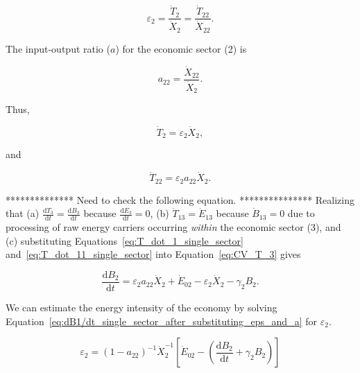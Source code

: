 \begin{equation} \label{eq:single_sector_energy_intensity}
	\varepsilon_{2} = \frac{\dot{T}_{2}}{\dot{X}_{2}} = \frac{\dot{T}_{22}}{\dot{X}_{22}}.
\end{equation}

The input-output ratio ($a$) for the economic sector (2) is

\begin{equation} \label{eq:io_ratio_single_sector}
	a_{22} = \frac{\dot{X}_{22}}{\dot{X}_{2}}.
\end{equation}

\noindent Thus,

\begin{equation} \label{eq:T_dot_1_single_sector}
	\dot{T}_{2} = \varepsilon_{2}\dot{X}_{2},
\end{equation}

\noindent and

\begin{equation} \label{eq:T_dot_11_single_sector}
	\dot{T}_{22} = \varepsilon_{2}a_{22}\dot{X}_{2}.
\end{equation}

************** Need to check the following equation. ***************
Realizing that 
(a) $\frac{\mathrm{d}T_3}{\mathrm{d}t} = \frac{\mathrm{d}B_3}{\mathrm{d}t}$ 
because $\frac{\mathrm{d}E_3}{\mathrm{d}t} = 0$, 
(b) $\dot{T}_{13} = \dot{E}_{13}$ because $\dot{B}_{13} = 0$ 
due to processing of raw energy carriers occurring \emph{within} the economic sector (3), and
(c) substituting Equations~\ref{eq:T_dot_1_single_sector} 
and~\ref{eq:T_dot_11_single_sector} into Equation~\ref{eq:CV_T_3} gives

\begin{equation} \label{eq:dB1/dt_single_sector_after_substituting_eps_and_a}
	\frac{\mathrm{d}B_{2}}{\mathrm{d}t} = \varepsilon_{2}a_{22}\dot{X}_{2} + \dot{E}_{02} - \varepsilon_{2}\dot{X}_{2} - \gamma_{2}B_{2}.
\end{equation}

We can estimate the energy intensity of the economy by solving 
Equation~\ref{eq:dB1/dt_single_sector_after_substituting_eps_and_a} 
for $\varepsilon_{2}$.

\begin{equation} \label{eq:eps3_ss_IO}
	\varepsilon_{2} 
	= {(1 - a_{22})}^{-1} \dot{X}_{2}^{-1} 
	\left[\dot{E}_{02} 
	      - \left(\frac{\mathrm{d}B_{2}}{\mathrm{d}t} 
		          + \gamma_{2}B_{2}
			\right)
	\right]
\end{equation}


